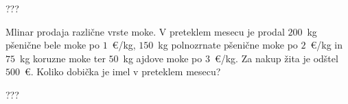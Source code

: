 \documentclass[addpoints]{exam}
\begin{document}
\begin{questions}
    \begin{solution}[5cm]
        ???
            \end{solution}
        
    \question[3]
    Mlinar prodaja različne vrste moke. V preteklem mesecu je prodal $200$~kg pšenične bele moke po $1$~\euro/kg, $150$~kg polnozrnate pšenične moke po $2$~\euro/kg in 
    $75$~kg koruzne moke ter $50$~kg ajdove moke po $3$~\euro/kg. Za nakup žita je odštel $500$~\euro. Koliko dobička je imel v preteklem mesecu?

    \begin{solution}[5cm]
        ???
            \end{solution}

    

\end{questions}
\end{document}
